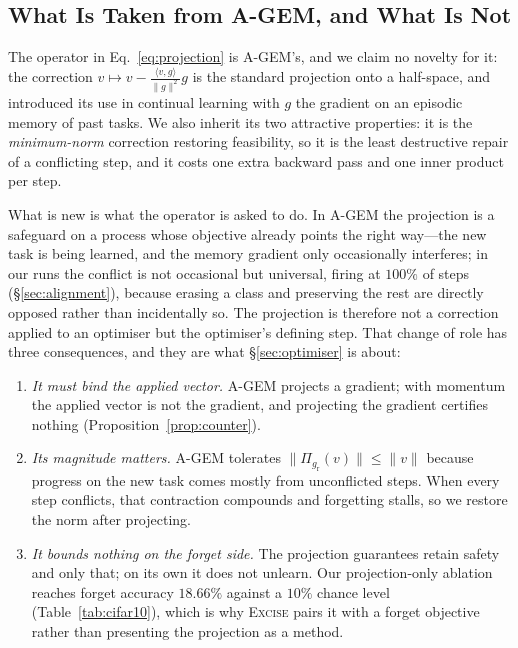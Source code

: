 \documentclass{article}
\newcommand{\ours}{\textsc{Excise}}
\newcommand{\gr}{g_{\mathrm{r}}}
\theoremstyle{remark}
\theoremstyle{plain}
\begin{document}
\subsection{What Is Taken from A-GEM, and What Is Not}

The operator in
Eq.~\ref{eq:projection} is A-GEM's, and we claim no novelty for it: the
correction $v \mapsto v - \frac{\langle v,g\rangle}{\|g\|^2}g$ is the standard
projection onto a half-space, and \citet{chaudhry2019agem} introduced its use in
continual learning with $g$ the gradient on an episodic memory of past tasks. We
also inherit its two attractive properties: it is the \emph{minimum-norm}
correction restoring feasibility, so it is the least destructive repair of a
conflicting step, and it costs one extra backward pass and one inner product per
step.

What is new is what the operator is asked to do. In A-GEM the projection is a
safeguard on a process whose objective already points the right way---the new
task is being learned, and the memory gradient only occasionally interferes; in
our runs the conflict is not occasional but universal, firing at $100\%$ of
steps (\S\ref{sec:alignment}), because erasing a class and preserving the rest
are directly opposed rather than incidentally so. The projection is therefore
not a correction applied to an optimiser but the optimiser's defining step. That
change of role has three consequences, and they are what
\S\ref{sec:optimiser} is about:
\begin{enumerate}
\item \emph{It must bind the applied vector.} A-GEM projects a gradient; with
momentum the applied vector is not the gradient, and projecting the gradient
certifies nothing (Proposition~\ref{prop:counter}).
\item \emph{Its magnitude matters.} A-GEM tolerates $\|\Pi_{\gr}(v)\| \le \|v\|$
because progress on the new task comes mostly from unconflicted steps. When
every step conflicts, that contraction compounds and forgetting stalls, so we
restore the norm after projecting.
\item \emph{It bounds nothing on the forget side.} The projection guarantees
retain safety and only that; on its own it does not unlearn. Our projection-only
ablation reaches forget accuracy $18.66\%$ against a $10\%$ chance level
(Table~\ref{tab:cifar10}), which is why \ours{} pairs it with a forget objective
rather than presenting the projection as a method.
\end{enumerate}
\end{document}
